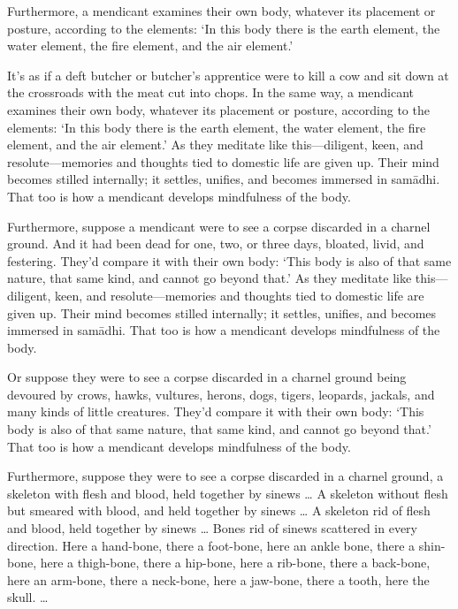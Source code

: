 \documentclass[12pt,openany]{book}%
\begin{document}
Furthermore, a mendicant examines their own body, whatever its placement or posture, according to the elements: ‘In this body there is the earth element, the water element, the fire element, and the air element.’ 

It’s as if a deft butcher or butcher’s apprentice were to kill a cow and sit down at the crossroads with the meat cut into chops. In the same way, a mendicant examines their own body, whatever its placement or posture, according to the elements: ‘In this body there is the earth element, the water element, the fire element, and the air element.’ As they meditate like this—diligent, keen, and resolute—memories and thoughts tied to domestic life are given up. Their mind becomes stilled internally; it settles, unifies, and becomes immersed in \textsanskrit{samādhi}. That too is how a mendicant develops mindfulness of the body. 

Furthermore, suppose a mendicant were to see a corpse discarded in a charnel ground. And it had been dead for one, two, or three days, bloated, livid, and festering. They’d compare it with their own body: ‘This body is also of that same nature, that same kind, and cannot go beyond that.’ As they meditate like this—diligent, keen, and resolute—memories and thoughts tied to domestic life are given up. Their mind becomes stilled internally; it settles, unifies, and becomes immersed in \textsanskrit{samādhi}. That too is how a mendicant develops mindfulness of the body. 

Or suppose they were to see a corpse discarded in a charnel ground being devoured by crows, hawks, vultures, herons, dogs, tigers, leopards, jackals, and many kinds of little creatures. They’d compare it with their own body: ‘This body is also of that same nature, that same kind, and cannot go beyond that.’ That too is how a mendicant develops mindfulness of the body. 

Furthermore, suppose they were to see a corpse discarded in a charnel ground, a skeleton with flesh and blood, held together by sinews … A skeleton without flesh but smeared with blood, and held together by sinews … A skeleton rid of flesh and blood, held together by sinews … Bones rid of sinews scattered in every direction. Here a hand-bone, there a foot-bone, here an ankle bone, there a shin-bone, here a thigh-bone, there a hip-bone, here a rib-bone, there a back-bone, here an arm-bone, there a neck-bone, here a jaw-bone, there a tooth, here the skull. … 
\end{document}
